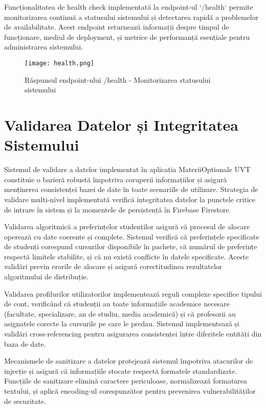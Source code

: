 \documentclass[12pt,a4paper]{report}
\begin{document}
Funcționalitatea de health check implementată la endpoint-ul `/health` permite monitorizarea continuă a statusului sistemului și detectarea rapidă a problemelor de availabilitate. Acest endpoint returnează informații despre timpul de funcționare, mediul de deployment, și metrice de performanță esențiale pentru administrarea sistemului.

\begin{figure}[H]
\centering
\texttt{[image: health.png]}
\caption{Răspunsul endpoint-ului /health - Monitorizarea statusului sistemului}
\label{fig:health-endpoint}
\end{figure}

\section{Validarea Datelor și Integritatea Sistemului}

Sistemul de validare a datelor implementat în aplicația MateriiOptionale UVT constituie o barieră robustă împotriva coruperii informațiilor și asigură menținerea consistenței bazei de date în toate scenariile de utilizare. Strategia de validare multi-nivel implementată verifică integritatea datelor la punctele critice de intrare în sistem și la momentele de persistență în Firebase Firestore.

Validarea algoritmică a preferințelor studenților asigură că procesul de alocare operează cu date coerente și complete. Sistemul verifică că preferințele specificate de studenți corespund cursurilor disponibile în pachete, că numărul de preferințe respectă limitele stabilite, și că nu există conflicte în datele specificate. Aceste validări previn erorile de alocare și asigură corectitudinea rezultatelor algoritmului de distribuție.

Validarea profilurilor utilizatorilor implementează reguli complexe specifice tipului de cont, verificând că studenții au toate informațiile academice necesare (facultate, specializare, an de studiu, media academică) și că profesorii au asignatele corecte la cursurile pe care le predau. Sistemul implementează și validări cross-referencing pentru asigurarea consistenței între diferitele entități din baza de date.

Mecanismele de sanitizare a datelor protejează sistemul împotriva atacurilor de injecție și asigură că informațiile stocate respectă formatele standardizate. Funcțiile de sanitizare elimină caractere periculoase, normalizează formatarea textului, și aplică encoding-ul corespunzător pentru prevenirea vulnerabilităților de securitate.
\end{document}
